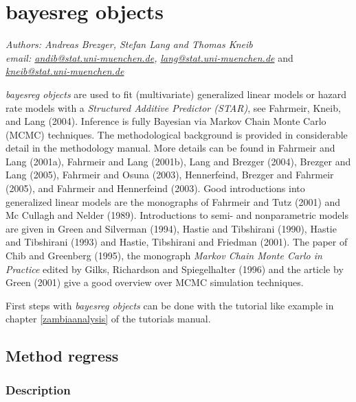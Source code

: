 \chapter{bayesreg objects}
\label{bayesreg} 

{\em Authors: Andreas Brezger, Stefan Lang and Thomas Kneib} \\
{\em email:
\href{mailto:andib@stat.uni-muenchen.de}{andib@stat.uni-muenchen.de},
\href{mailto:lang@stat.uni-muenchen.de}{lang@stat.uni-muenchen.de}}
and
{\em\href{mailto:kneib@stat.uni-muenchen.de}{kneib@stat.uni-muenchen.de}} \\
\vspace{0.3cm}


{\em bayesreg objects} are used to fit (multivariate) generalized
linear models or hazard rate models with a {\em Structured Additive
Predictor (STAR)}, see Fahrmeir, Kneib, and Lang (2004). Inference
is fully Bayesian via Markov Chain Monte Carlo (MCMC) techniques.
The methodological background is provided in considerable detail in
the methodology manual. More details can be found in Fahrmeir and
Lang (2001a), Fahrmeir and Lang (2001b), Lang and Brezger (2004),
Brezger and Lang (2005), Fahrmeir and Osuna (2003), Hennerfeind,
Brezger and Fahrmeir (2005), and Fahrmeir and Hennerfeind (2003).
Good introductions into generalized linear models are the monographs
of Fahrmeir and Tutz (2001) and Mc Cullagh and Nelder (1989).
Introductions to semi- and nonparametric models are given in Green
and Silverman (1994), Hastie and Tibshirani (1990), Hastie and
Tibshirani (1993) and Hastie, Tibshirani and Friedman (2001). The
paper of Chib and Greenberg (1995), the monograph {\em Markov Chain
Monte Carlo in Practice} edited by Gilks, Richardson and
Spiegelhalter (1996) and the article by Green (2001) give a good
overview over MCMC simulation techniques.

First steps with {\em bayesreg objects} can be done with the
tutorial like example in chapter \ref*{zambiaanalysis} of the
tutorials manual.

\clearpage

\section{Method regress}
\label{bayesregress} 

\subsection{Description}
\label{bayesregregressdescr}

